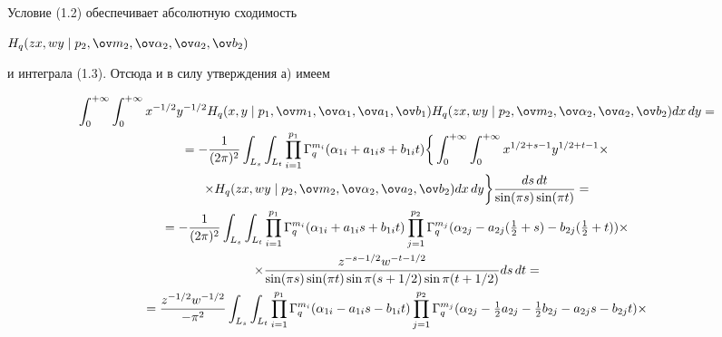 Условие (1.2) обеспечивает абсолютную сходимость 


$H_q(z x, w y\mid p_2,\ov m_2,\ov\alpha_2,\ov a_2,\ov b_2)$ 


и интеграла (1.3). Отсюда и в силу утверждения а) имеем 


\begin{multline*} 


\int^{+\infty}_0\int^{+\infty}_0 x^{-1/2}y^{-1/2} 


H_q(x,y\mid p_1,\ov m_1,\ov\alpha_1,\ov a_1,\ov b_1) 


H_q(z x, w y\mid p_2,\ov m_2,\ov\alpha_2,\ov a_2,\ov b_2)dx\,dy=\\ 


% 


=-\frac{1}{(2\pi)^2}\int_{L_s}\int_{L_t}\prod^{p_1}_{i=1} 


\Gamma^{m_i}_q(\alpha_{1i}+a_{1i}s+b_{1i}t)\bigg\{ 


\int^{+\infty}_0\int^{+\infty}_0 x^{1/2+s-1}y^{1/2+t-1}\times \\ 


% 


\times H_q(z x,w y\mid p_2,\ov m_2,\ov\alpha_2,\ov a_2,\ov b_2) 


dx\,dy\bigg\}\frac{ds\,dt}{\sin(\pi s)\sin(\pi t)}= \\ 


% 


=-\frac{1}{(2\pi)^2}\int_{L_s}\int_{L_t}\prod^{p_1}_{i=1} 


\Gamma^{m_i}_q(\alpha_{1i}+a_{1i}s+b_{1i}t) 


\prod^{p_2}_{j=1}\Gamma^{m_j}_q(\alpha_{2j}-a_{2j} 


(\tfrac{1}{2}+s)-b_{2j}(\tfrac{1}{2}+t))\times \\ 


% 


\times \frac{z^{-s-1/2}w^{-t-1/2}} 


{\sin(\pi s)\sin(\pi t)\sin\pi(s+1/2)\sin\pi(t+1/2)}ds\,dt =\\ 


% 


=\frac{z^{-1/2}w^{-1/2}}{-\pi^2}\int_{L_s}\int_{L_t} 


\prod^{p_1}_{i=1}\Gamma_q^{m_i}(\alpha_{1i}-a_{1i}s-b_{1i}t) 


\prod^{p_2}_{j=1}\Gamma^{m_j}_q(\alpha_{2j}-\tfrac{1}{2}a_{2j}- 


\tfrac{1}{2}b_{2j}-a_{2j}s-b_{2j}t) \times\\



\end{multline*}
